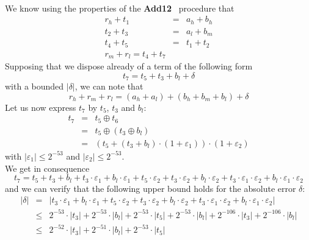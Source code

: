 \documentclass[a4paper,10pt,twoside]{article}
\newenvironment{proof}[1][Proof]{\begin{trivlist}
\item[\hskip \labelsep {\bfseries #1}]}{\end{trivlist}}
\newcommand{\hi}{\ensuremath{\mathit{h}}}
\newcommand{\mi}{\ensuremath{\mathit{m}}}
\newcommand{\lo}{\ensuremath{\mathit{l}}}
\newcommand{\Add}{{\bf Add12}}
\renewcommand{\epsilon}{\varepsilon}
\begin{document}
\begin{proof} ~ \\
We know using the properties of the \Add~ procedure that 
\begin{eqnarray*}
r_\hi + t_1 & = & a_\hi + b_\hi \\
t_2 + t_3 & = & a_\lo + b_\mi \\
t_4 + t_5 & = & t_1 + t_2 \\
r_\mi + r_\lo = t_4 + t_7 
\end{eqnarray*}
Supposing that we dispose already of a term of the following form
$$t_7 = t_5 + t_3 + b_\lo + \delta$$
with a bounded $\left \vert \delta \right \vert$,
we can note that 
$$r_\hi + r_\mi + r_\lo = \left( a_\hi + a_\lo \right) + \left( b_\hi + b_\mi + b_\lo \right) + \delta$$
Let us now express $t_7$ by $t_5$, $t_3$ and $b_\lo$:
\begin{eqnarray*}
t_7 & = & t_5 \oplus t_6 \\
& = & t_5 \oplus \left( t_3 \oplus b_\lo \right) \\
& = & \left( t_5 + \left( t_3 + b_\lo \right) \cdot \left( 1 + \epsilon_1 \right) \right) \cdot \left( 1 + \epsilon_2 \right)
\end{eqnarray*}
with $\left \vert \epsilon_1 \right \vert \leq 2^{-53}$ and $\left \vert \epsilon_2 \right \vert \leq 2^{-53}$.\\
We get in consequence
$$t_7 = t_5 + t_3 + b_\lo + t_3 \cdot \epsilon_1 + b_\lo \cdot \epsilon_1 + t_5 \cdot \epsilon_2 + t_3 \cdot \epsilon_2 + b_\lo \cdot \epsilon_2 +
t_3 \cdot \epsilon_1 \cdot \epsilon_2 + b_\lo \cdot \epsilon_1 \cdot \epsilon_2$$
and we can verify that the following upper bound holds for the absolute error $\delta$:
\begin{eqnarray*}
\left \vert \delta \right \vert & = & 
\left \vert t_3 \cdot \epsilon_1 + b_\lo \cdot \epsilon_1 + t_5 \cdot \epsilon_2 + t_3 \cdot \epsilon_2 + b_\lo \cdot \epsilon_2 +
t_3 \cdot \epsilon_1 \cdot \epsilon_2 + b_\lo \cdot \epsilon_1 \cdot \epsilon_2 \right \vert \\
& \leq & 2^{-53} \cdot \left \vert t_3 \right \vert + 2^{-53} \cdot \left \vert b_\lo \right \vert + 2^{-53} \cdot \left \vert t_5 \right \vert + 
2^{-53} \cdot \left \vert b_\lo \right \vert + 2^{-106} \cdot \left \vert t_3 \right \vert + 2^{-106} \cdot \left \vert b_\lo \right \vert \\
& \leq & 2^{-52} \cdot \left \vert t_3 \right \vert + 2^{-51} \cdot \left \vert b_\lo \right \vert + 2^{-53} \cdot \left \vert t_5 \right \vert
\end{eqnarray*}

\end{proof}
\end{document}
